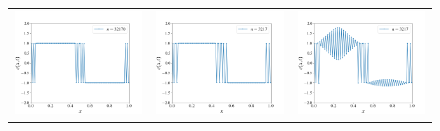 \documentclass[12pt, reqno]{report}
\theoremstyle{definition}
\theoremstyle{remark}
\begin{document}
\begin{figure}[H]
\begin{tabular}{ccc}
        \includegraphics[width = \acfdwidth]{media_paper/very_stable_CH_CN_32170.png} &
        \includegraphics[width = \acfdwidth]{media_paper/stable_CH_CN_3217} &
        \includegraphics[width = \acfdwidth]{media_paper/unstable_CH_CN_3217} \\

\end{tabular}
\end{figure}
\end{document}

